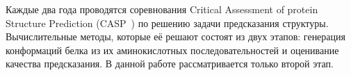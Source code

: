\documentclass[14pt]{extarticle}
\begin{document}
Каждые два года проводятся соревнования Critical Assessment of protein Structure Prediction (CASP~\cite{CASP}) по решению задачи предсказания структуры. 	Вычислительные методы, которые её решают состоят из двух этапов: генерация конформаций белка из их аминокислотных последовательностей и оценивание качества предсказания. В данной работе рассматривается только второй этап.
\begin{figure}[H]
	\centering
	\label{fig:edge}
\end{figure}
\end{document}
